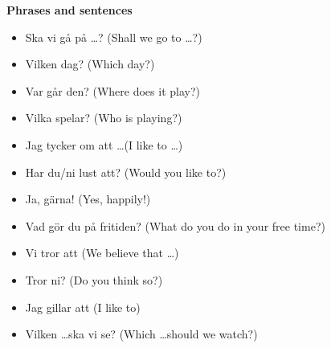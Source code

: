 
\begin{flushleft}
    \textbf{Phrases and sentences}
    \begin{itemize}
        \item Ska vi gå på \ldots? (Shall we go to \ldots?)
        \item Vilken dag? (Which day?)
        \item Var går den? (Where does it play?)
        \item Vilka spelar? (Who is playing?)
        \item Jag tycker om att \ldots (I like to \ldots)
        \item Har du/ni lust att? (Would you like to?)
        \item Ja, gärna! (Yes, happily!)
        \item Vad gör du på fritiden? (What do you do in your free time?)
        \item Vi tror att (We believe that \ldots)
        \item Tror ni? (Do you think so?)
        \item Jag gillar att (I like to)
        \item Vilken \ldots ska vi se? (Which \ldots should we watch?)
    \end{itemize}
\end{flushleft}

